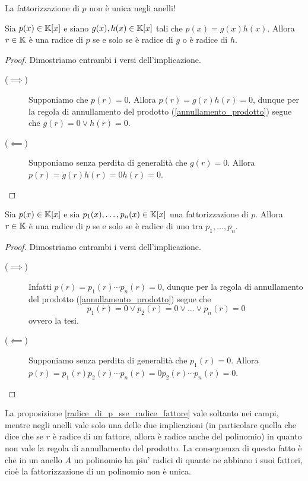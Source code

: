 \begin{remark}
    La fattorizzazione di $p$ non è unica negli anelli!
\end{remark}

\begin{proposition}\label{radice_di_p_sse_radice_fattore}
    Sia $p(x) \in \mathbb{K}[x]$ e siano $g(x), h(x) \in \mathbb{K}[x]$ tali che $p(x) = g(x)h(x)$. Allora $r \in \mathbb{K}$ è una radice di $p$ se e solo se è radice di $g$ o è radice di $h$.
\end{proposition}
\begin{proof}
    Dimostriamo entrambi i versi dell'implicazione.
    \begin{description}
        \item[($\implies$)] Supponiamo che $p(r) = 0$. Allora $p(r) = g(r)h(r) = 0$, dunque per la regola di annullamento del prodotto (\ref{annullamento_prodotto}) segue che $g(r) = 0 \lor h(r) = 0$.
        \item[($\impliedby$)] Supponiamo senza perdita di generalità che $g(r) = 0$. Allora $p(r) = g(r)h(r) = 0h(r) = 0$. \qedhere 
    \end{description}
\end{proof}
\begin{corollary}
    Sia $p(x) \in \mathbb{K}[x]$ e sia $p_1(x), \dots, p_n(x) \in \mathbb{K}[x]$ una fattorizzazione di $p$. Allora $r \in \mathbb{K}$ è una radice di $p$ se e solo se è radice di uno tra $p_1, \dots, p_n$.
\end{corollary}
\begin{proof}
    Dimostriamo entrambi i versi dell'implicazione.
    \begin{description}
        \item[($\implies$)] Infatti $p(r) = p_1(r) \cdots p_n(r) = 0$, dunque per la regola di annullamento del prodotto (\ref{annullamento_prodotto}) segue che \[
            p_1(r) = 0 \lor p_2(r) = 0 \lor \dots \lor p_n(r) = 0    
        \] ovvero la tesi.
        \item[($\impliedby$)] Supponiamo senza perdita di generalità che $p_1(r) = 0$. Allora $p(r) = p_1(r)p_2(r)\cdots p_n(r) = 0p_2(r)\cdots p_n(r) = 0$. \qedhere
    \end{description} 
\end{proof}

\begin{remark}
    La proposizione \ref{radice_di_p_sse_radice_fattore} vale soltanto nei campi, mentre negli anelli vale solo una delle due implicazioni (in particolare quella che dice che se $r$ è radice di un fattore, allora è radice anche del polinomio) in quanto non vale la regola di annullamento del prodotto. La conseguenza di questo fatto è che in un anello $A$ un polinomio ha piu' radici di quante ne abbiano i suoi fattori, cioè la fattorizzazione di un polinomio non è unica.
\end{remark}

